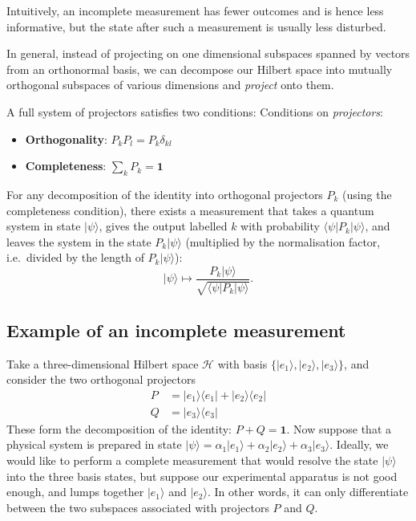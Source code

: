 \documentclass[fleqn,a4paper]{article}
\providecommand{\tightlist}{\setlength{\itemsep}{0pt}\setlength{\parskip}{0pt}}
\newenvironment{idea}{\everypar{\setlength{\parindent}{1.5em}}}{}
\theoremstyle{definition}
\theoremstyle{definition}
\theoremstyle{definition}
\theoremstyle{definition}
\theoremstyle{remark}
\begin{document}
\begin{idea}
Intuitively, an incomplete measurement has fewer outcomes and is hence less informative, but the state after such a measurement is usually less disturbed.

\end{idea}

In general, instead of projecting on one dimensional subspaces spanned by vectors from an orthonormal basis, we can decompose our Hilbert space into mutually orthogonal subspaces of various dimensions and \emph{project} onto them.

\begin{idea}

A full system of projectors satisfies two conditions:
Conditions on \emph{projectors}:

\begin{itemize}
\tightlist
\item
  \textbf{Orthogonality}: \(P_k P_l = P_k\delta_{kl}\)
\item
  \textbf{Completeness}: \(\sum_k P_k = \mathbf{1}\)
\end{itemize}

\end{idea}

For any decomposition of the identity into orthogonal projectors \(P_k\) (using the completeness condition), there exists a measurement that takes a quantum system in state \(|\psi\rangle\), gives the output labelled \(k\) with probability \(\langle\psi|P_k|\psi\rangle\), and leaves the system in the state \(P_k|\psi\rangle\) (multiplied by the normalisation factor, i.e.~divided by the length of \(P_k|\psi\rangle\)):
\[
  |\psi\rangle
  \mapsto
  \frac{P_k|\psi\rangle}{\sqrt{\langle\psi|P_k|\psi\rangle}}.
\]

\hypertarget{example-of-an-incomplete-measurement}{%
\subsection{Example of an incomplete measurement}\label{example-of-an-incomplete-measurement}}

Take a three-dimensional Hilbert space \(\mathcal{H}\) with basis \(\{|e_1\rangle,|e_2\rangle,|e_3\rangle\}\), and consider the two orthogonal projectors
\[
  \begin{aligned}
    P &= |e_1\rangle\langle e_1| + |e_2\rangle\langle e_2|
  \\Q &= |e_3\rangle\langle e_3|
  \end{aligned}
\]
These form the decomposition of the identity: \(P+Q=\mathbf{1}\).
Now suppose that a physical system is prepared in state \(|\psi\rangle = \alpha_1|e_1\rangle + \alpha_2|e_2\rangle + \alpha_3|e_3\rangle\).
Ideally, we would like to perform a complete measurement that would resolve the state \(|\psi\rangle\) into the three basis states, but suppose our experimental apparatus is not good enough, and lumps together \(|e_1\rangle\) and \(|e_2\rangle\).
In other words, it can only differentiate between the two subspaces associated with projectors \(P\) and \(Q\).
\end{document}

